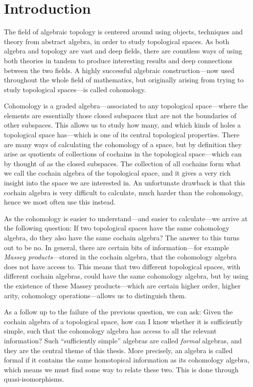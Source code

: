 
\section{Introduction}
\label{sec:introduction}

The field of algebraic topology is centered around using objects, techniques and theory from abstract algebra, in order to study topological spaces. As both algebra and topology are vast and deep fields, there are countless ways of using both theories in tandem to produce interesting results and deep connections between the two fields. A highly successful algebraic construction---now used throughout the whole field of mathematics, but originally arising from trying to study topological spaces---is called cohomology. 

Cohomology is a graded algebra---associated to any topological space---where the elements are essentially those closed subspaces that are not the boundaries of other subspaces. This allows us to study how many, and which kinds of holes a topological space has---which is one of its central topological properties. There are many ways of calculating the cohomology of a space, but by definition they arise as quotients of collections of cochains in the topological space---which can by thought of as the closed subspaces. The collection of all cochains form what we call the cochain algebra of the topological space, and it gives a very rich insight into the space we are interested in. An unfortunate drawback is that this cochain algebra is very difficult to calculate, much harder than the cohomology, hence we most often use this instead.

As the cohomology is easier to understand---and easier to calculate---we arrive at the following question: If two topological spaces have the same cohomology algebra, do they also have the same cochain algebra? The answer to this turns out to be no. In general, there are certain bits of information---for example \emph{Massey products}---stored in the cochain algebra, that the cohomology algebra does not have access to. This means that two different topological spaces, with different cochain algebras, could have the same cohomology algebra, but by using the existence of these Massey products---which are certain higher order, higher arity, cohomology operations---allows us to distinguish them. 

As a follow up to the failure of the previous question, we can ask: Given the cochain algebra of a topological space, how can I know whether it is sufficiently simple, such that the cohomology algebra has access to all the relevant information? Such ``sufficiently simple'' algebras are called \emph{formal} algebras, and they are the central theme of this thesis. More precisely, an algebra is called formal if it contains the same homotopical information as its cohomology algebra, which means we must find some way to relate these two. This is done through quasi-isomorphisms. 

